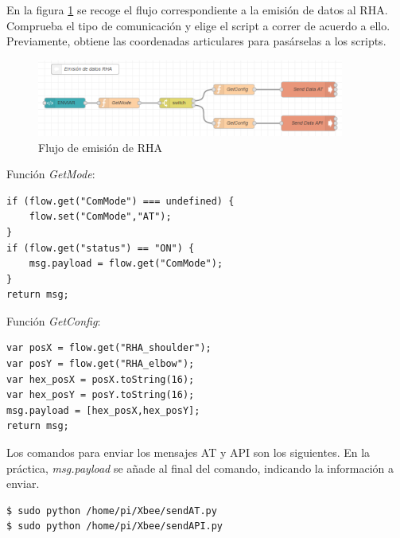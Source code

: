 En la figura \ref{fig:emisionRHA} se recoge el flujo correspondiente a la emisión de datos al RHA. Comprueba el tipo de comunicación y elige el script a correr de acuerdo a ello. Previamente, obtiene las coordenadas articulares para pasárselas a los scripts.

\begin{figure}[H]
\centering
\includegraphics[width=0.9\textwidth]{figuras/emisionFlowRHA.png}
\caption{Flujo de emisión de RHA}
\label{fig:emisionRHA}
\end{figure}

Función \textit{GetMode}:


\begin{lstlisting}[frame=leftline, caption={GetMode}, label=code:GetMode]
if (flow.get("ComMode") === undefined) {
    flow.set("ComMode","AT");
}
if (flow.get("status") == "ON") {
    msg.payload = flow.get("ComMode");
}
return msg;
\end{lstlisting}

Función \textit{GetConfig}:

\begin{lstlisting}[frame=leftline, caption={GetConfig}, label=code:GetConfig]
var posX = flow.get("RHA_shoulder");
var posY = flow.get("RHA_elbow");
var hex_posX = posX.toString(16);
var hex_posY = posY.toString(16);
msg.payload = [hex_posX,hex_posY];
return msg;
\end{lstlisting}

Los comandos para enviar los mensajes AT y API son los siguientes. En la práctica, \textit{msg.payload} se añade al final del comando, indicando la información a enviar.


\begin{lstlisting}[frame=single, label=command:sendDataRHA]
$ sudo python /home/pi/Xbee/sendAT.py
$ sudo python /home/pi/Xbee/sendAPI.py
\end{lstlisting}

